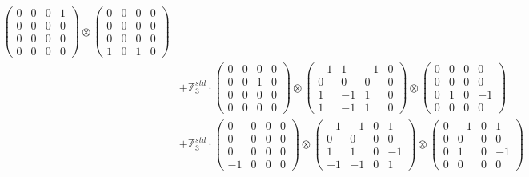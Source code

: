 \documentclass{article}
\begin{document}
{\begin{align}
            \begin{pmatrix} 0 & 0 & 0 & 1 \\ 0 & 0 & 0 & 0 \\ 0 & 0 & 0 & 0 \\ 0 & 0 & 0 & 0 \end{pmatrix} \otimes 
            \begin{pmatrix} 0 & 0 & 0 & 0 \\ 0 & 0 & 0 & 0 \\ 0 & 0 & 0 & 0 \\ 1 & 0 & 1 & 0 \end{pmatrix} \\ 
        &+ \label{Rs16-Rc11-Solution-15-c20} \mathbb{Z}_3^{std} \cdot 
            \begin{pmatrix} 0 & 0 & 0 & 0 \\ 0 & 0 & 1 & 0 \\ 0 & 0 & 0 & 0 \\ 0 & 0 & 0 & 0 \end{pmatrix} \otimes 
            \begin{pmatrix} -1 & 1 & -1 & 0 \\ 0 & 0 & 0 & 0 \\ 1 & -1 & 1 & 0 \\ 1 & -1 & 1 & 0 \end{pmatrix} \otimes 
            \begin{pmatrix} 0 & 0 & 0 & 0 \\ 0 & 0 & 0 & 0 \\ 0 & 1 & 0 & -1 \\ 0 & 0 & 0 & 0 \end{pmatrix} \\ 
        &+ \label{Rs16-Rc11-Solution-15-c21} \mathbb{Z}_3^{std} \cdot 
            \begin{pmatrix} 0 & 0 & 0 & 0 \\ 0 & 0 & 0 & 0 \\ 0 & 0 & 0 & 0 \\ -1 & 0 & 0 & 0 \end{pmatrix} \otimes 
            \begin{pmatrix} -1 & -1 & 0 & 1 \\ 0 & 0 & 0 & 0 \\ 1 & 1 & 0 & -1 \\ -1 & -1 & 0 & 1 \end{pmatrix} \otimes 
            \begin{pmatrix} 0 & -1 & 0 & 1 \\ 0 & 0 & 0 & 0 \\ 0 & 1 & 0 & -1 \\ 0 & 0 & 0 & 0 \end{pmatrix} \\ 

\end{align}}
\end{document}
